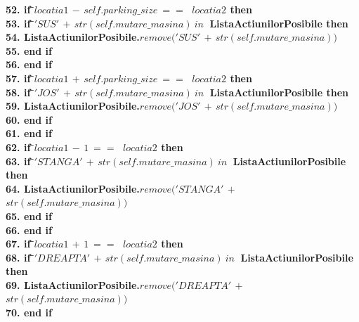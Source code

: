 \documentclass{article}
\begin{document}
\begin{center}
\begin{tabbing}
\bfseries{52.}\indent\>       \>\textbf{if } \=$locatia1$ $-$ $self.parking\_size \ == \ $ $ locatia2$ \textbf{ then} \\
\bfseries{53.}\indent\>       \>\>\textbf{if } \=$'SUS'$ $+$ $str(self.mutare\_masina) \ in \ $ \textbf{ListaActiunilorPosibile} \textbf{ then} \\
\bfseries{54.}\indent          \> \> \> \>\textbf{ListaActiunilorPosibile}.$remove('SUS'$ $+$ $str(self.mutare\_masina))$\\
\bfseries{55.}\indent          \> \>  \>\textbf{end if}\\
\bfseries{56.}\indent\>        \>\textbf{end if}\\
\bfseries{57.}\indent\>       \>\textbf{if } \=$locatia1$ $+$ $self.parking\_size \ == \ $ $ locatia2$ \textbf{ then} \\
\bfseries{58.}\indent\>       \>\>\textbf{if } \=$'JOS'$ $+$ $str(self.mutare\_masina) \ in \ $ \textbf{ListaActiunilorPosibile} \textbf{ then} \\
\bfseries{59.}\indent          \> \> \> \>\textbf{ListaActiunilorPosibile}.$remove('JOS'$ $+$ $str(self.mutare\_masina))$\\
\bfseries{60.}\indent          \> \>  \>\textbf{end if}\\
\bfseries{61.}\indent\>        \>\textbf{end if}\\
\bfseries{62.}\indent\>       \>\textbf{if } \=$locatia1$ $-$ $ 1 \ == \ $ $ locatia2$ \textbf{ then} \\
\bfseries{63.}\indent\>       \>\>\textbf{if } \=$'STANGA'$ $+$ $str(self.mutare\_masina) \ in \ $ \textbf{ListaActiunilorPosibile} \textbf{ then} \\
\bfseries{64.}\indent          \> \> \> \>\textbf{ListaActiunilorPosibile}.$remove('STANGA'$ $+$ $str(self.mutare\_masina))$\\
\bfseries{65.}\indent          \> \>  \>\textbf{end if}\\
\bfseries{66.}\indent\>        \>\textbf{end if}\\
\bfseries{67.}\indent\>       \>\textbf{if } \=$locatia1$ $+$ $ 1 \ == \ $ $ locatia2$ \textbf{ then} \\
\bfseries{68.}\indent\>       \>\>\textbf{if } \=$'DREAPTA'$ $+$ $str(self.mutare\_masina) \ in \ $ \textbf{ListaActiunilorPosibile} \textbf{ then} \\
\bfseries{69.}\indent          \> \> \> \>\textbf{ListaActiunilorPosibile}.$remove('DREAPTA'$ $+$ $str(self.mutare\_masina))$\\
\bfseries{70.}\indent          \> \>  \>\textbf{end if}\\

\end{tabbing}
\end{center}
\end{document}
